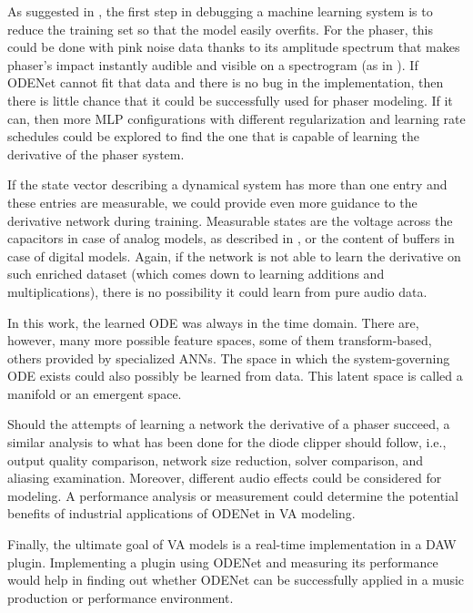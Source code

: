 As suggested in \cite{Bengio2012}, the first step in debugging a machine learning system is to reduce the training set so that the model easily overfits. For the phaser, this could be done with pink noise data thanks to its amplitude spectrum that makes phaser's impact instantly audible and visible on a spectrogram (as in ). If ODENet cannot fit that data and there is no bug in the implementation, then there is little chance that it could be successfully used for phaser modeling. If it can, then more \ac{MLP} configurations with different regularization and learning rate schedules could be explored to find the one that is capable of learning the derivative of the phaser system.

If the state vector describing a dynamical system has more than one entry and these entries are measurable, we could provide even more guidance to the derivative network during training. Measurable states are the voltage across the capacitors in case of analog models, as described in \cite{Parker2019}, or the content of buffers in case of digital models. Again, if the network is not able to learn the derivative on such enriched dataset (which comes down to learning additions and multiplications), there is no possibility it could learn from pure audio data.

In this work, the learned \ac{ODE} was always in the time domain. There are, however, many more possible feature spaces, some of them transform-based, others provided by specialized \acp{ANN}. %
The space in which the system-governing \ac{ODE} exists could also possibly be learned from data. This latent space is called a manifold \cite{Goodfellow-et-al-2016} or an emergent space. %

Should the attempts of learning a network the derivative of a phaser succeed, a similar analysis to what has been done for the diode clipper should follow, i.e., output quality comparison, network size reduction, solver comparison, and aliasing examination. Moreover, different audio effects could be considered for modeling. A performance analysis or measurement could determine the potential benefits of industrial applications of ODENet in \ac{VA} modeling.

Finally, the ultimate goal of \ac{VA} models is a real-time implementation in a \ac{DAW} plugin. Implementing a plugin using ODENet and measuring its performance would help in finding out whether ODENet can be successfully applied in a music production or performance environment.
